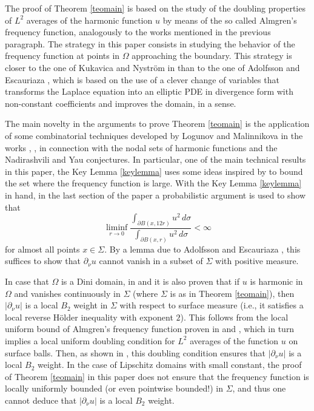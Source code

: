 \documentclass[11pt]{amsart}
\theoremstyle{definition}
\theoremstyle{remark}
\numberwithin{equation}{section}
\begin{document}
The proof of Theorem \ref{teomain} is based on the study of the doubling properties of $L^2$ averages of the harmonic
function $u$ by means of the so called Almgren's frequency function,
analogously to the  works mentioned in the previous paragraph.  The strategy in this paper 
consists in studying the behavior of the frequency 
function at points in $\Omega$ approaching the boundary. This strategy
is closer to the one of 
Kukavica and Nystr\"om in \cite{KN} than to the one of Adolfsson and Escauriaza \cite{AE}, which is
based on the use of a clever change of variables that transforms the Laplace equation
into an elliptic PDE in divergence form with non-constant coefficients and improves the domain, in a sense.

The main novelty in the arguments to prove Theorem \ref{teomain} is the application of some combinatorial techniques developed by Logunov and Malinnikova
in the works \cite{Logunov1}, \cite{Logunov2}, \cite{LM} in connection with the nodal sets of harmonic functions and
the Nadirashvili and Yau conjectures. In particular, one of the main technical results in this paper,
the Key Lemma \ref{keylemma} uses some ideas inspired by \cite{Logunov1} to bound the set where the
frequency function is large.
With the Key Lemma \ref{keylemma} in hand, in the last section of the paper a probabilistic argument is used
to show that
$$\liminf_{r\to0} \frac{\int_{\partial B(x,12r)} u^2\,d\sigma}{\int_{\partial B(x,r)} u^2\,d\sigma} < \infty$$
for almost all points  $x\in\Sigma$. By a lemma due to Adolfsson and Escauriaza \cite[Lemma 0.2]{AE},
this suffices to show that $\partial_\nu u$ cannot vanish
in a subset of $\Sigma$ with positive measure.

In case that $\Omega$ is a Dini domain, in \cite{AE} and \cite{KN} it is also proven that if $u$ is harmonic in $\Omega$ and vanishes continuously 
in $\Sigma$ (where $\Sigma$ is as in Theorem \ref{teomain}), then $|\partial_\nu u| $ is a local $B_2$ weight
in $\Sigma$ with respect to surface measure (i.e., it satisfies a local reverse H\"older inequality with exponent $2$). This follows
from the local uniform bound of Almgren's frequency function proven in \cite{AE} and \cite{KN}, which in turn implies 
a local uniform doubling condition for $L^2$ averages of the function $u$ on surface balls. Then, as
shown in \cite[Theorem 1]{AEK}, this doubling condition ensures that $|\partial_\nu u| $ is a local $B_2$ weight. In the case of Lipschitz domains with small constant, the proof of Theorem \ref{teomain} in this paper does
not ensure that the frequency function is locally uniformly bounded (or even pointwise bounded!) in $\Sigma$, and
thus one cannot deduce that $|\partial_\nu u| $ is a local $B_2$ weight.
\end{document}
